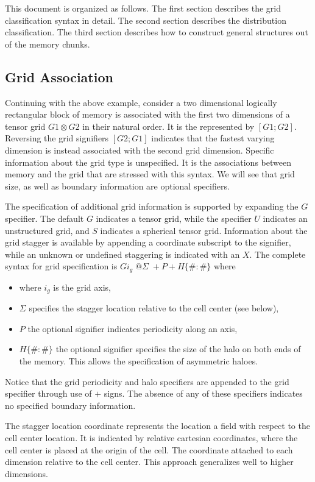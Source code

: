 \documentclass{article}
\begin{document}
This document is organized as follows. The first section describes the grid classification syntax in detail. The second section describes the distribution classification. The third section describes how to construct general structures out of the memory chunks. 

\subsection{Grid Association}
Continuing with the above example, consider a two dimensional logically rectangular block of memory is associated with the first two dimensions of a tensor grid $G1 \otimes G2$ in their natural order. It is the represented by $[ G1; G2 ]$. Reversing the grid signifiers $[ G2; G1 ]$ indicates that the fastest varying dimension is instead associated with the second grid dimension. Specific information about the grid type is unspecified. It is the associations between memory and the grid that are stressed with this syntax. We will see that grid size, as well as boundary information are optional specifiers. 

The specification of additional grid information is supported by expanding the $G$ specifier. The default $G$ indicates a tensor grid, while the specifier $U$ indicates an unstructured grid, and $S$ indicates a spherical tensor grid. Information about the grid stagger is available by appending a coordinate subscript to the signifier, while an unknown or undefined staggering is indicated with an $X$.
The complete syntax for grid specification is $G i_g \; @ \Sigma \; + P + H \{ \# : \# \}$ where
\begin{itemize}
	\item where $i_g$ is the grid axis,
	\item $\Sigma$ specifies the stagger location relative to  the cell center (see below),
	\item $P$ the optional signifier indicates periodicity along an axis,
	\item $H \{ \# : \# \}$ the optional signifier specifies the size of the  halo on both ends of the memory. This allows the specification of asymmetric haloes.
\end{itemize}
Notice that the grid periodicity and halo specifiers are appended to the grid specifier through use of $+$ signs. The absence of any of these specifiers indicates no specified boundary information.

The stagger location coordinate represents the location a field with respect to the cell center location. It is indicated by relative cartesian coordinates, where the cell center is placed at the origin of the cell. The coordinate attached to each dimension relative to the cell center. This approach generalizes well to higher dimensions. 
\end{document}

